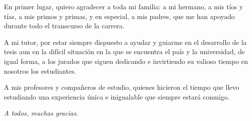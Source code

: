 En primer lugar, quiero agradecer a toda mi familia: a mi hermano, a mis tíos y tías, a mis primos y primas, y en especial, a mis padres, que me han apoyado durante todo el transcurso de la carrera.

A mi tutor, por estar siempre dispuesto a ayudar y guiarme en el desarrollo de la tesis aun en la difícil situación en la que se encuentra el país y la universidad, de igual forma, a los jurados que siguen dedicando e invirtiendo su valioso tiempo en nosotros los estudiantes.

A mis profesores y compañeros de estudio, quienes hicieron el tiempo que llevo estudiando una experiencia única e inigualable que siempre estará conmigo.

\vspace{20pt}


\begin{flushright}
    \Large
    \itshape{A todos, muchas gracias.}
\end{flushright}
